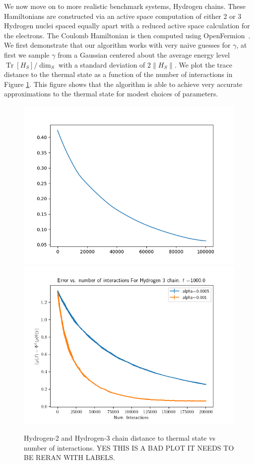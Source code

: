 \documentclass{article}
\newcommand{\brackets}[1]{\left[ #1 \right]}
\newcommand{\norm}[1]{\| #1 \|}
\DeclareMathOperator{\Tr}{Tr}
\newcommand{\trace}[1]{\Tr \brackets{ #1 }}
\begin{document}
We now move on to more realistic benchmark systems, Hydrogen chains. These Hamiltonians are constructed via an active space computation of either 2 or 3 Hydrogen nuclei spaced equally apart with a reduced active space calculation for the electrons. The Coulomb Hamiltonian is then computed using OpenFermion~\cite{mcclean2020openfermion}. We first demonstrate that our algorithm works with very naive guesses for $\gamma$, at first we sample $\gamma$ from a Gaussian centered about the average energy level $\trace{H_S} / \dim_S$ with a standard deviation of $2 \norm{H_S}$. We plot the trace distance to the thermal state as a function of the number of interactions in Figure \ref{fig:h_chain_error}. This figure shows that the algorithm is able to achieve very accurate approximations to the thermal state for modest choices of parameters. 

\begin{figure}
    \centering
    \includegraphics[width=0.45\linewidth]{numerics/data/h2_chain_2.png}
    \includegraphics[width = 0.45\linewidth]{numerics/data/h3_chain_7.png}
    \caption{Hydrogen-2 and Hydrogen-3 chain distance to thermal state vs number of interactions. YES THIS IS A BAD PLOT IT NEEDS TO BE RERAN WITH LABELS.}
    \label{fig:h_chain_error}
\end{figure}
\end{document}
